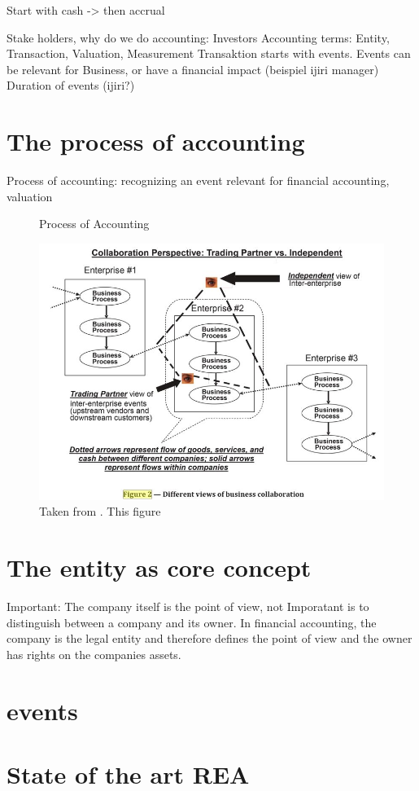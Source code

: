 Start with cash -> then accrual


Stake holders, why do we do accounting: Investors
Accounting terms: Entity, Transaction, Valuation, Measurement
Transaktion starts with events.
Events can be relevant for Business, or have a financial impact (beispiel ijiri manager)
Duration of events (ijiri?)

\section{The process of accounting}
Process of accounting: recognizing an event relevant for financial accounting, valuation

\begin{figure}
	\centering
	\caption{Process of Accounting}
	\label{fig:accounting-process}
	\includegraphics[width=0.7\linewidth]{"../figures/replace/CollaborativePerspective"}
	\caption*{Taken from \cite[p.3]{horngren2006introduction}. This figure }
\end{figure}

\section{The entity as core concept}
Important: The company itself is the point of view, not
Imporatant is to distinguish between a company and its owner. In financial accounting, the company is the legal entity and therefore defines the point of view and the owner has rights on the companies assets.

\section{events}

\section{State of the art REA}
